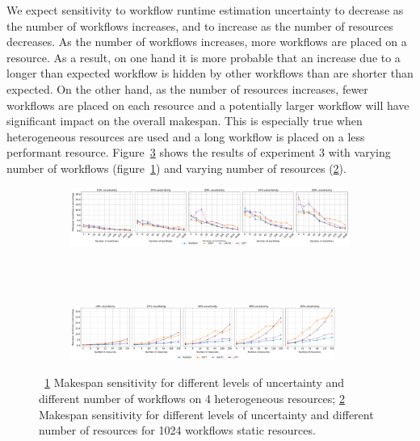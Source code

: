 We expect sensitivity to workflow runtime estimation uncertainty to decrease as
the number of workflows increases, and to increase as the number of resources
decreases. As the number of workflows increases, more workflows are placed on a
resource. As a result, on one hand it is more probable that an increase
 due to a longer than expected workflow is hidden
by other workflows than are shorter than expected. On the other hand, as the
number of resources increases, fewer workflows are placed on each resource and a
potentially larger workflow will have significant impact on the overall
makespan. This is especially true when heterogeneous resources are used and a
long workflow is placed on a less performant resource.
Figure~\ref{fig:inaccur_st} shows the results of experiment 3 with varying
number of workflows (figure~\ref{fig:InaccurStHeteroCampaigns_4StHeteroResourcesSens}) and
varying number of resources (\ref{fig:InaccurStHeteroResources_StHeteroCampaignsSens}).

\begin{figure}[ht!]
    \centering
    \begin{subfigure}[b]{0.95\textwidth}
        \includegraphics[width=.95\textwidth]{figures/campaign/InaccurStHeteroCampaigns_4StHeteroResourcesSens.pdf}
        \caption{}
        \label{fig:InaccurStHeteroCampaigns_4StHeteroResourcesSens}
    \end{subfigure}\\
    ~
    \begin{subfigure}[b]{0.95\textwidth}
        \includegraphics[width=0.95\textwidth]{figures/campaign/InaccurStHeteroResources_StHeteroCampaignsSens.pdf}
        \caption{}
        \label{fig:InaccurStHeteroResources_StHeteroCampaignsSens}
    \end{subfigure}
    \caption{~\ref{fig:InaccurStHeteroCampaigns_4StHeteroResourcesSens} Makespan
    sensitivity for different levels of uncertainty and different number of
    workflows on 4 heterogeneous resources;
    \ref{fig:InaccurStHeteroResources_StHeteroCampaignsSens} Makespan
    sensitivity for different levels of uncertainty and different number of
    resources for 1024 workflows static resources.}
    \label{fig:inaccur_st}
\end{figure}

